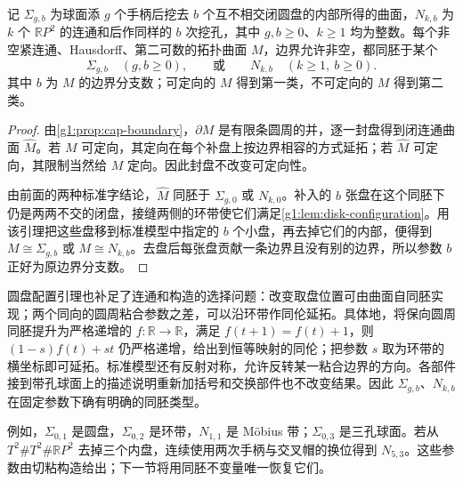 \begin{theorem}\label{g1:thm:surface-standard-existence}
	记 \(\Sigma_{g,b}\) 为球面添 \(g\) 个手柄后挖去 \(b\) 个互不相交闭圆盘的内部所得的曲面，\(N_{k,b}\) 为 \(k\) 个 \(\mathbb RP^2\) 的连通和后作同样的 \(b\) 次挖孔，其中 \(g,b\ge0\)、\(k\ge1\) 均为整数。每个非空紧连通、Hausdorff、第二可数的拓扑曲面 \(M\)，边界允许非空，都同胚于某个
	\[
		\Sigma_{g,b}\quad(g,b\ge0),\qquad\text{或}\qquad N_{k,b}\quad(k\ge1,\ b\ge0).
	\]
	其中 \(b\) 为 \(M\) 的边界分支数；可定向的 \(M\) 得到第一类，不可定向的 \(M\) 得到第二类。
\end{theorem}
\begin{proof}
	由\cref{g1:prop:cap-boundary}，\(\partial M\) 是有限条圆周的并，逐一封盘得到闭连通曲面 \(\widehat M\)。若 \(M\) 可定向，其定向在每个补盘上按边界相容的方式延拓；若 \(\widehat M\) 可定向，其限制当然给 \(M\) 定向。因此封盘不改变可定向性。

	由前面的两种标准字结论，\(\widehat M\) 同胚于 \(\Sigma_{g,0}\) 或 \(N_{k,0}\)。补入的 \(b\) 张盘在这个同胚下仍是两两不交的闭盘，接缝两侧的环带使它们满足\cref{g1:lem:disk-configuration}。用该引理把这些盘移到标准模型中指定的 \(b\) 个小盘，再去掉它们的内部，便得到 \(M\cong\Sigma_{g,b}\) 或 \(M\cong N_{k,b}\)。去盘后每张盘贡献一条边界且没有别的边界，所以参数 \(b\) 正好为原边界分支数。
\end{proof}

圆盘配置引理也补足了连通和构造的选择问题：改变取盘位置可由曲面自同胚实现；两个同向的圆周粘合参数之差，可以沿环带作同伦延拓。具体地，将保向圆周同胚提升为严格递增的 \(f:\mathbb R\to\mathbb R\)，满足 \(f(t+1)=f(t)+1\)，则 \((1-s)f(t)+st\) 仍严格递增，给出到恒等映射的同伦；把参数 \(s\) 取为环带的横坐标即可延拓。标准模型还有反射对称，允许反转某一粘合边界的方向。各部件接到带孔球面上的描述说明重新加括号和交换部件也不改变结果。因此 \(\Sigma_{g,b}\)、\(N_{k,b}\) 在固定参数下确有明确的同胚类型。

例如，\(\Sigma_{0,1}\) 是圆盘，\(\Sigma_{0,2}\) 是环带，\(N_{1,1}\) 是 Möbius 带；\(\Sigma_{0,3}\) 是三孔球面。若从 \(T^2\#T^2\#\mathbb RP^2\) 去掉三个内盘，连续使用两次手柄与交叉帽的换位得到 \(N_{5,3}\)。这些参数由切粘构造给出；下一节将用同胚不变量唯一恢复它们。
